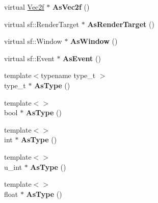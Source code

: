 \begin{DoxyCompactItemize}
\item 
\hypertarget{class_k_g_e_1_1_data_abdf66ea9cddd1847cc3ecb09219f4031}{virtual \hyperlink{struct_k_g_e_1_1_vec2f}{Vec2f} $\ast$ {\bfseries As\-Vec2f} ()}\label{class_k_g_e_1_1_data_abdf66ea9cddd1847cc3ecb09219f4031}

\item 
\hypertarget{class_k_g_e_1_1_data_ae8f1d21b0687e36f6cce97a6c3aed5ff}{virtual sf\-::\-Render\-Target $\ast$ {\bfseries As\-Render\-Target} ()}\label{class_k_g_e_1_1_data_ae8f1d21b0687e36f6cce97a6c3aed5ff}

\item 
\hypertarget{class_k_g_e_1_1_data_ac4baaf11bd6728d9cd9d63ff6fe8bbaa}{virtual sf\-::\-Window $\ast$ {\bfseries As\-Window} ()}\label{class_k_g_e_1_1_data_ac4baaf11bd6728d9cd9d63ff6fe8bbaa}

\item 
\hypertarget{class_k_g_e_1_1_data_a30ad6275889382b2d6e8ec30ff00e9f3}{virtual sf\-::\-Event $\ast$ {\bfseries As\-Event} ()}\label{class_k_g_e_1_1_data_a30ad6275889382b2d6e8ec30ff00e9f3}

\item 
\hypertarget{class_k_g_e_1_1_data_ae441b92dfdddc37e9d9f9569f5708dfa}{{\footnotesize template$<$typename type\-\_\-t $>$ }\\type\-\_\-t $\ast$ {\bfseries As\-Type} ()}\label{class_k_g_e_1_1_data_ae441b92dfdddc37e9d9f9569f5708dfa}

\item 
\hypertarget{class_k_g_e_1_1_data_ae067732636c584bb9121b8723e2eb516}{{\footnotesize template$<$$>$ }\\bool $\ast$ {\bfseries As\-Type} ()}\label{class_k_g_e_1_1_data_ae067732636c584bb9121b8723e2eb516}

\item 
\hypertarget{class_k_g_e_1_1_data_a9c93f6bfd0dedc3a5358782deb31ec16}{{\footnotesize template$<$$>$ }\\int $\ast$ {\bfseries As\-Type} ()}\label{class_k_g_e_1_1_data_a9c93f6bfd0dedc3a5358782deb31ec16}

\item 
\hypertarget{class_k_g_e_1_1_data_af99913afa7d34f7136ba1caa5d078ff0}{{\footnotesize template$<$$>$ }\\u\-\_\-int $\ast$ {\bfseries As\-Type} ()}\label{class_k_g_e_1_1_data_af99913afa7d34f7136ba1caa5d078ff0}

\item 
\hypertarget{class_k_g_e_1_1_data_aa7b9df68f1d2a59c54c2d0d17ede27a3}{{\footnotesize template$<$$>$ }\\float $\ast$ {\bfseries As\-Type} ()}\label{class_k_g_e_1_1_data_aa7b9df68f1d2a59c54c2d0d17ede27a3}


\end{DoxyCompactItemize}
